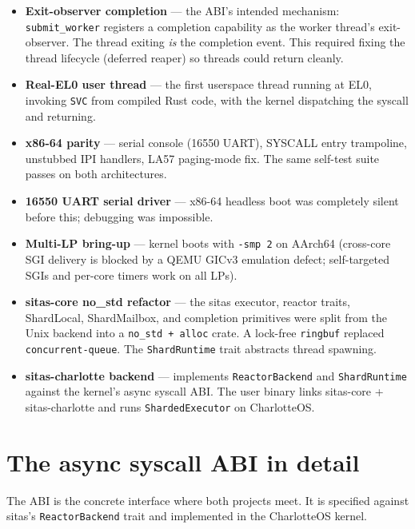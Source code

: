 \begin{itemize}
    \item \textbf{Exit-observer completion} --- the ABI's intended mechanism:
        \texttt{submit\_worker} registers a completion capability as the
        worker thread's exit-observer. The thread exiting \emph{is} the
        completion event. This required fixing the thread lifecycle
        (deferred reaper) so threads could return cleanly.
    \item \textbf{Real-EL0 user thread} --- the first userspace thread running
        at EL0, invoking \texttt{SVC} from compiled Rust code, with the kernel
        dispatching the syscall and returning.
    \item \textbf{x86-64 parity} --- serial console (16550 UART), SYSCALL entry
        trampoline, unstubbed IPI handlers, LA57 paging-mode fix. The same
        self-test suite passes on both architectures.
    \item \textbf{16550 UART serial driver} --- x86-64 headless boot was
        completely silent before this; debugging was impossible.
    \item \textbf{Multi-LP bring-up} --- kernel boots with \texttt{-smp 2} on
        AArch64 (cross-core SGI delivery is blocked by a QEMU GICv3 emulation
        defect; self-targeted SGIs and per-core timers work on all LPs).
    \item \textbf{sitas-core no\_std refactor} --- the sitas executor, reactor
        traits, ShardLocal, ShardMailbox, and completion primitives were split
        from the Unix backend into a \texttt{no\_std + alloc} crate. A lock-free
        \texttt{ringbuf} replaced \texttt{concurrent-queue}. The
        \texttt{ShardRuntime} trait abstracts thread spawning.
    \item \textbf{sitas-charlotte backend} --- implements
        \texttt{ReactorBackend} and \texttt{ShardRuntime} against the kernel's
        async syscall ABI. The user binary links sitas-core + sitas-charlotte
        and runs \texttt{ShardedExecutor} on CharlotteOS.
\end{itemize}

\section{The async syscall ABI in detail}

The ABI is the concrete interface where both projects meet. It is specified
against sitas's \texttt{ReactorBackend} trait and implemented in the
CharlotteOS kernel.

